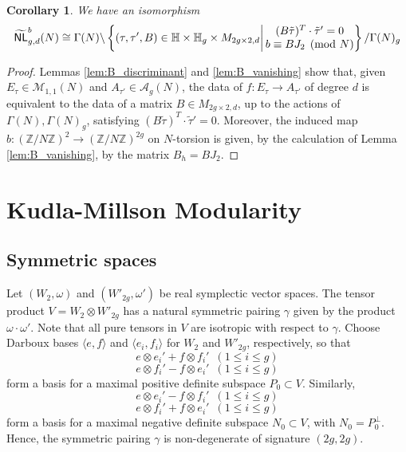\documentclass[12pt]{amsart}
\def\cA{\mathcal{A}}
\def\bH{\mathbb{H}}
\def\cM{\mathcal{M}}
\def\bZ{\mathbb{Z}}
\newcommand{\wNL}{{\widetilde{\mathsf{NL}}}}
\newtheorem{cor}[thm]{Corollary}
\theoremstyle{definition}
\begin{document}
\begin{cor}
    We have an isomorphism
    \begin{equation*}
        \wNL^b_{g,d}(N)\cong \Gamma(N)\backslash \left\{(\tau,\tau',B)\in\bH\times\bH_g\times M_{2g\times 2,d} \middle\vert \, 
        \begin{array}{@{}c@{}}
            (B \tilde{\tau})^T\cdot \tilde{\tau}'=0\\
            b\equiv BJ_2\pmod{N}
        \end{array}
        \right\} /\Gamma(N)_g
    \end{equation*} 
\end{cor}

\begin{proof}
Lemmas \ref{lem:B_discriminant} and \ref{lem:B_vanishing} show that, given $E_\tau\in \cM_{1,1}(N)$ and $A_{\tau'}\in \cA_g(N)$, the data of $f:E_\tau\to A_{\tau'}$ of degree $d$ is equivalent to the data of a matrix $B\in M_{2g\times 2,d}$, up to the actions of $\Gamma(N),\Gamma(N)_g$, satisfying $(B \tilde{\tau})^T\cdot \tilde{\tau}'=0$. Moreover, the induced map $b:(\bZ/N\bZ)^{2}\to(\bZ/N\bZ)^{2g}$ on $N$-torsion is given, by the calculation of Lemma \ref{lem:B_vanishing}, by the matrix $B_h=BJ_2$. 
\end{proof}

\section{Kudla-Millson Modularity}\label{km_sec}
\subsection{Symmetric spaces}
Let $(W_2, \omega)$ and $(W'_{2g}, \omega')$ be real symplectic vector spaces. The tensor product $V=W_2\otimes W'_{2g}$ has a natural symmetric pairing $\gamma$ given by the product $\omega\cdot\omega'$. Note that all pure tensors in $V$ are isotropic with respect to $\gamma$. Choose Darboux bases $
\langle e,f\rangle$ and $\langle e_i,f_i\rangle$ for $W_2$ and $W'_{2g}$, respectively, so that
$$e\otimes e_i' + f\otimes f_i'\,\,\,(1\leq i \leq g)$$
$$e\otimes f_i' - f\otimes e_i'\,\,\,(1\leq i \leq g)$$
form a basis for a maximal positive definite subspace $P_0\subset V$. Similarly,
$$e\otimes e_i' - f\otimes f_i'\,\,\,(1\leq i \leq g)$$
$$e\otimes f_i' + f\otimes e_i'\,\,\,(1\leq i \leq g)$$
form a basis for a maximal negative definite subspace $N_0\subset V$, with $N_0 = P_0^\perp$. Hence, the symmetric pairing $\gamma$ is non-degenerate of signature $(2g,2g)$.
\end{document}
